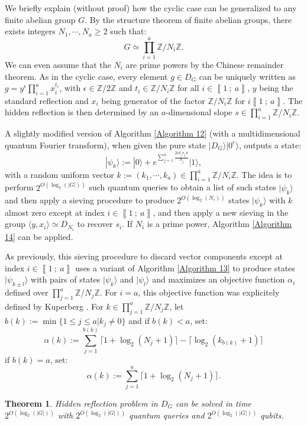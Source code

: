 \documentclass[a4paper,10pt,notitlepage]{report}
\theoremstyle{definition}
\theoremstyle{plain}
\newtheorem{Theorem}[Definition]{Theorem}
\theoremstyle{definition}
\newcommand{\Z}{\mathbb{Z}}
\renewcommand{\i}[2]{\left\llbracket #1~;~#2\right\rrbracket}
\renewcommand{\(}{\left(}
\renewcommand{\)}{\right)}
\begin{document}
We briefly explain (without proof) how the cyclic case can be generalized to any finite abelian group $G$. By the structure theorem of finite abelian groups, there exists integers $N_1,\cdots,N_a\geq 2$ such that:
\[G\simeq\prod_{i=1}^a \Z/N_i\Z.\]
We can even assume that the $N_i$ are prime powers by the Chinese remainder theorem. As in the cyclic case, every element $g\in D_G$ can be uniquely written as $g=y^\epsilon \prod_{i=1}^a x_i^{t_i}$, with $\epsilon\in\Z/2\Z$ and $t_i\in\Z/N_i\Z$ for all $i\in\i{1}{a}$, $y$ being the standard reflection and $x_i$ being generator of the factor $\Z/N_i\Z$ for $i\i{1}{a}$. The hidden reflection is then determined by an $a$-dimensional slope $s\in\prod_{i=1}^a \Z/N_i\Z$.

A slightly modified version of Algorithm \ref{Algorithm 12} (with a multidimensional quantum Fourier transform), when given the pure state $|D_G\rangle|0^e\rangle$, outputs a state:
\[|\psi_k\rangle:=|0\rangle +e^{\sum_{j=1}^a \frac{2ik_js_j\pi}{N_j}}|1\rangle,\]
with a random uniform vector $k:=(k_1, \cdots, k_a)\in\prod_{i=1}^a \Z/N_i\Z$. The idea is to perform $2^{O(\log_2(|G|))}$ such quantum queries to obtain a list of such states $|\psi_k\rangle$ and then apply a sieving procedure to produce $2^{O(\log_2(N_i))}$ states $|\psi_k\rangle$ with $k$ almost zero except at index $i\in\i{1}{a}$, and then apply a new sieving in the group $\langle y, x_i\rangle\simeq D_{N_i}$ to recover $s_i$.  If $N_i$ is a prime power, Algorithm \ref{Algorithm 14} can be applied.

As previously, this sieving procedure to discard vector components except at index $i\in\i{1}{a}$ uses a variant of Algorithm \ref{Algorithm 13} to produce states $|\psi_{k\pm l}\rangle$ with pairs of states $|\psi_k\rangle$ and $|\psi_l\rangle$ and maximizes an objective function $\alpha_i$ defined over $\prod_{j=1}^a \Z/N_j\Z$. For $i=a$, this objective function was explicitely defined by Kuperberg \cite[proof of Theorem 7.1]{Kuperberg}. For $k\in\prod_{j=1}^a \Z/N_j\Z$, let $b(k):=\min\{1\leq j\leq a| k_j\neq 0\}$ and if $b(k)<a$, set:
\[\alpha(k):=\sum_{j=1}^{b(k)}\lceil 1+\log_2(N_j+1)\rceil -\lceil\log_2(k_{b(k)}+1)\rceil\]
if $b(k)=a$, set:
\[\alpha(k):=\sum_{j=1}^{a}\lceil 1+\log_2(N_j+1)\rceil.\]

\begin{Theorem}
Hidden reflection problem in $D_G$ can be solved in time $2^{O(\log_2(|G|))}$ with $2^{O(\log_2(|G|))}$ quantum queries and $2^{O(\log_2(|G|))}$ qubits.
\end{Theorem}
\end{document}
